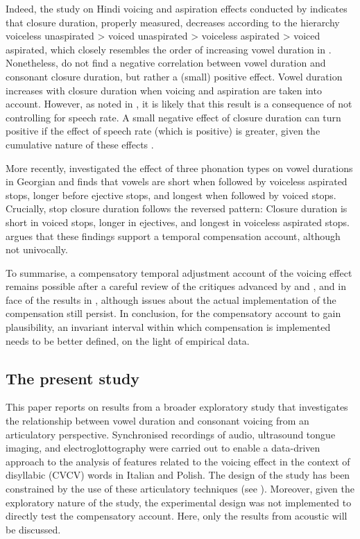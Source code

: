 \documentclass[preprint]{JASAnew}
\begin{document}
Indeed, the study on Hindi voicing and aspiration effects conducted by
\citet{durvasula2012} indicates that closure duration, properly
measured, decreases according to the hierarchy voiceless unaspirated
\textgreater{} voiced unaspirated \textgreater{} voiceless aspirated
\textgreater{} voiced aspirated, which closely resembles the order of
increasing vowel duration in \citet{maddieson1976}. Nonetheless,
\citet{durvasula2012} do not find a negative correlation between vowel
duration and consonant closure duration, but rather a (small) positive
effect. Vowel duration increases with closure duration when voicing and
aspiration are taken into account. However, as noted in
\citet{begus2017}, it is likely that this result is a consequence of not
controlling for speech rate. A small negative effect of closure duration
can turn positive if the effect of speech rate (which is positive) is
greater, given the cumulative nature of these effects
\citep[2177]{begus2017}.

More recently, \citet{begus2017} investigated the effect of three
phonation types on vowel durations in Georgian and finds that vowels are
short when followed by voiceless aspirated stops, longer before ejective
stops, and longest when followed by voiced stops. Crucially, stop
closure duration follows the reversed pattern: Closure duration is short
in voiced stops, longer in ejectives, and longest in voiceless aspirated
stops. \citet{begus2017} argues that these findings support a temporal
compensation account, although not univocally.

To summarise, a compensatory temporal adjustment account of the voicing
effect remains possible after a careful review of the critiques advanced
by \citet{chen1970} and \citet{maddieson1976}, and in face of the
results in \citet{begus2017}, although issues about the actual
implementation of the compensation still persist. In conclusion, for the
compensatory account to gain plausibility, an invariant interval within
which compensation is implemented needs to be better defined, on the
light of empirical data.

\hypertarget{the-present-study}{%
\subsection{The present study}\label{the-present-study}}

This paper reports on results from a broader exploratory study that
investigates the relationship between vowel duration and consonant
voicing from an articulatory perspective. Synchronised recordings of
audio, ultrasound tongue imaging, and electroglottography were carried
out to enable a data-driven approach to the analysis of features related
to the voicing effect in the context of disyllabic (CVCV) words in
Italian and Polish. The design of the study has been constrained by the
use of these articulatory techniques (see ). Moreover,
given the exploratory nature of the study, the experimental design was
not implemented to directly test the compensatory account. Here, only
the results from acoustic will be discussed.
\end{document}
